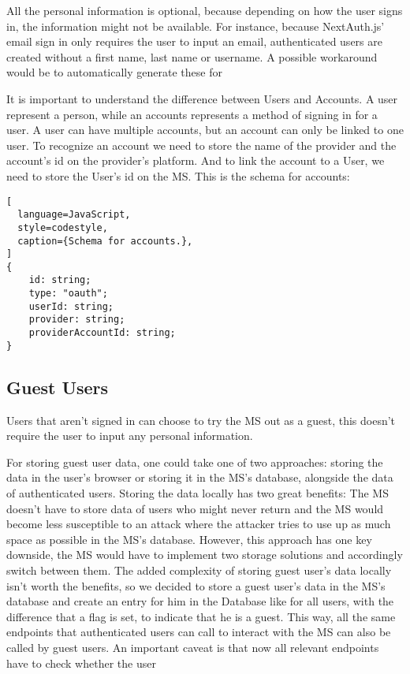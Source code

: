 All the personal information is optional, because depending on how the user signs in, the
information might not be available.
For instance, because NextAuth.js' email sign in only requires the user to input an
email, authenticated users are created without a first name, last name or username.
A possible workaround would be to automatically generate these for 


It is important to understand the difference between Users and Accounts.
A user represent a person, while an accounts represents a method of signing in for a user.
A user can have multiple accounts, but an account can only be linked to one user.
To recognize an account we need to store the name of the provider and the account's
id on the provider's platform.
And to link the account to a User, we need to store the User's id on the MS.
This is the schema for accounts:

\begin{lstlisting}[
  language=JavaScript,
  style=codestyle,
  caption={Schema for accounts.},
]
{
    id: string;
    type: "oauth";
    userId: string;
    provider: string;
    providerAccountId: string;
}
\end{lstlisting}

\subsection{Guest Users}

Users that aren't signed in can choose to try the MS out as a guest, this doesn't require
the user to input any personal information.

For storing guest user data, one could take one of two approaches:
storing the data in the user's browser or storing it in the MS's database, alongside the
data of authenticated users.
Storing the data locally has two great benefits: 
The MS doesn't have to store data of users who might never return and
the MS would become less susceptible to an attack where the attacker tries to use up as
much space as possible in the MS's database.
However, this approach has one key downside, the MS would have to implement two storage
solutions and accordingly switch between them.
The added complexity of storing guest user's data locally isn't worth the benefits, so we
decided to store a guest user's data in the MS's database and create an entry for him in
the Database like for all users, with the difference that a flag is set, to indicate that
he is a guest.
This way, all the same endpoints that authenticated users can call to interact with the MS
can also be called by guest users.
An important caveat is that now all relevant endpoints have to check whether the user 


